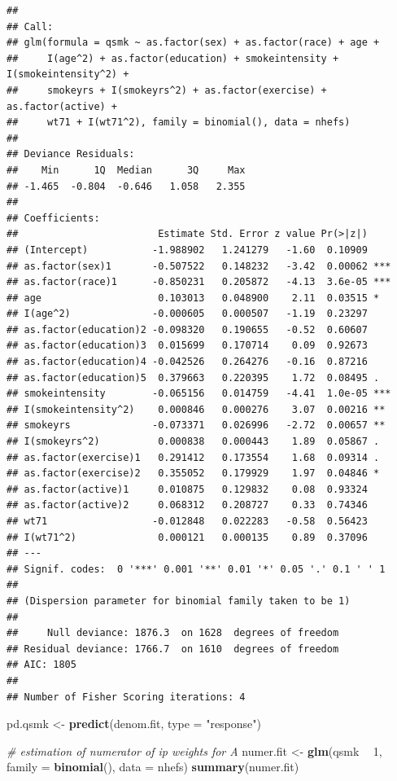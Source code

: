 \documentclass[
  10pt,
]{book}
\newenvironment{Shaded}{\begin{snugshade}}{\end{snugshade}}
\newcommand{\CommentTok}[1]{\textcolor[rgb]{0.56,0.35,0.01}{\textit{#1}}}
\newcommand{\DataTypeTok}[1]{\textcolor[rgb]{0.13,0.29,0.53}{#1}}
\newcommand{\DecValTok}[1]{\textcolor[rgb]{0.00,0.00,0.81}{#1}}
\newcommand{\KeywordTok}[1]{\textcolor[rgb]{0.13,0.29,0.53}{\textbf{#1}}}
\newcommand{\NormalTok}[1]{#1}
\newcommand{\OperatorTok}[1]{\textcolor[rgb]{0.81,0.36,0.00}{\textbf{#1}}}
\newcommand{\StringTok}[1]{\textcolor[rgb]{0.31,0.60,0.02}{#1}}
\begin{document}
\begin{verbatim}
## 
## Call:
## glm(formula = qsmk ~ as.factor(sex) + as.factor(race) + age + 
##     I(age^2) + as.factor(education) + smokeintensity + I(smokeintensity^2) + 
##     smokeyrs + I(smokeyrs^2) + as.factor(exercise) + as.factor(active) + 
##     wt71 + I(wt71^2), family = binomial(), data = nhefs)
## 
## Deviance Residuals: 
##    Min      1Q  Median      3Q     Max  
## -1.465  -0.804  -0.646   1.058   2.355  
## 
## Coefficients:
##                        Estimate Std. Error z value Pr(>|z|)    
## (Intercept)           -1.988902   1.241279   -1.60  0.10909    
## as.factor(sex)1       -0.507522   0.148232   -3.42  0.00062 ***
## as.factor(race)1      -0.850231   0.205872   -4.13  3.6e-05 ***
## age                    0.103013   0.048900    2.11  0.03515 *  
## I(age^2)              -0.000605   0.000507   -1.19  0.23297    
## as.factor(education)2 -0.098320   0.190655   -0.52  0.60607    
## as.factor(education)3  0.015699   0.170714    0.09  0.92673    
## as.factor(education)4 -0.042526   0.264276   -0.16  0.87216    
## as.factor(education)5  0.379663   0.220395    1.72  0.08495 .  
## smokeintensity        -0.065156   0.014759   -4.41  1.0e-05 ***
## I(smokeintensity^2)    0.000846   0.000276    3.07  0.00216 ** 
## smokeyrs              -0.073371   0.026996   -2.72  0.00657 ** 
## I(smokeyrs^2)          0.000838   0.000443    1.89  0.05867 .  
## as.factor(exercise)1   0.291412   0.173554    1.68  0.09314 .  
## as.factor(exercise)2   0.355052   0.179929    1.97  0.04846 *  
## as.factor(active)1     0.010875   0.129832    0.08  0.93324    
## as.factor(active)2     0.068312   0.208727    0.33  0.74346    
## wt71                  -0.012848   0.022283   -0.58  0.56423    
## I(wt71^2)              0.000121   0.000135    0.89  0.37096    
## ---
## Signif. codes:  0 '***' 0.001 '**' 0.01 '*' 0.05 '.' 0.1 ' ' 1
## 
## (Dispersion parameter for binomial family taken to be 1)
## 
##     Null deviance: 1876.3  on 1628  degrees of freedom
## Residual deviance: 1766.7  on 1610  degrees of freedom
## AIC: 1805
## 
## Number of Fisher Scoring iterations: 4
\end{verbatim}

\begin{Shaded}
\begin{Highlighting}[]
\NormalTok{pd.qsmk <-}\StringTok{ }\KeywordTok{predict}\NormalTok{(denom.fit, }\DataTypeTok{type =} \StringTok{"response"}\NormalTok{)}

\CommentTok{# estimation of numerator of ip weights for A}
\NormalTok{numer.fit <-}\StringTok{ }\KeywordTok{glm}\NormalTok{(qsmk }\OperatorTok{~}\StringTok{ }\DecValTok{1}\NormalTok{, }\DataTypeTok{family =} \KeywordTok{binomial}\NormalTok{(), }\DataTypeTok{data =}\NormalTok{ nhefs)}
\KeywordTok{summary}\NormalTok{(numer.fit)}
\end{Highlighting}
\end{Shaded}
\end{document}
